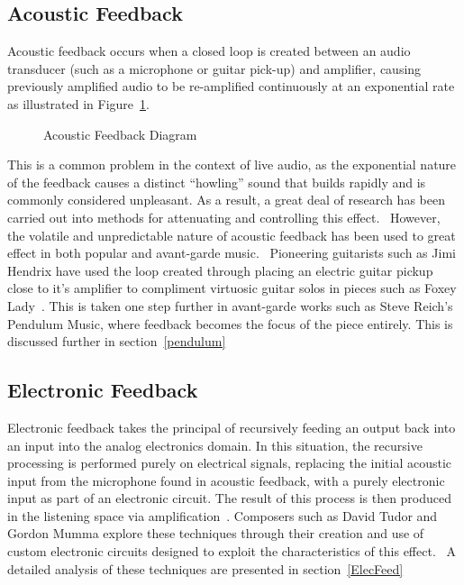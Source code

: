 \documentclass[titlepage]{scrartcl}
\begin{document}
    \subsection{Acoustic Feedback}
    Acoustic feedback occurs when a closed loop is created between an audio
    transducer (such as a microphone or guitar pick-up) and amplifier,
    causing previously amplified audio to be re-amplified continuously at an
    exponential rate as illustrated in Figure~\ref{acoustic_feedback}.\\
    \begin{figure}[H]
        \caption[Caption for LOF]{Acoustic Feedback Diagram\protect\footnotemark}
        \label{acoustic_feedback}
    \end{figure}


    This is a common problem in the context of live audio, as the exponential
    nature of the feedback causes a distinct ``howling'' sound that builds
    rapidly and is commonly considered unpleasant. As a result, a great deal of
    research has been carried out into methods for attenuating and controlling
    this effect.~\parencite[p.1]{waterschoot2010fyafc} However, the volatile
    and unpredictable nature of acoustic feedback has been used to great effect
    in both popular and avant-garde music.~\parencite[p.186]{holmes2012eaem}
    Pioneering guitarists such as Jimi Hendrix have used the loop created
    through placing an electric guitar pickup close to it's amplifier to
    compliment virtuosic guitar solos in pieces such as Foxey
    Lady~\citeyearpar{hendrix1967fl}. This is taken one step further in
    avant-garde works such as Steve Reich's Pendulum Music, where feedback
    becomes the focus of the piece entirely. This is discussed further in
    section~\ref{pendulum}
    
    \subsection{Electronic Feedback}
    Electronic feedback takes the principal of recursively feeding an output
    back into an input into the analog electronics domain. In this situation,
    the recursive processing is performed purely on electrical signals,
    replacing the initial acoustic input from the microphone found in acoustic
    feedback, with a purely electronic input as part of an electronic circuit.
    The result of this process is then produced in the listening space via
    amplification~\parencite[p.187]{holmes2012eaem}. Composers such as David
    Tudor and Gordon Mumma explore these techniques through their creation and
    use of custom electronic circuits designed to exploit the characteristics
    of this effect.~\parencite[p.186, 390]{holmes2012eaem} A detailed analysis
    of these techniques are presented in section~\ref{ElecFeed}\\
\end{document}
